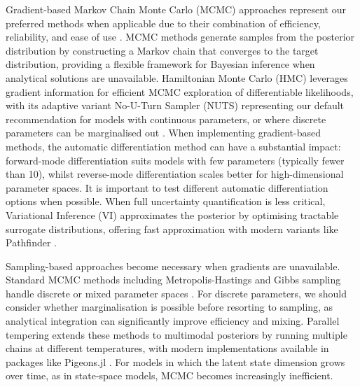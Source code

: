 \documentclass{article}
\begin{document}
Gradient-based Markov Chain Monte Carlo (MCMC) approaches represent our preferred methods when applicable due to their combination of efficiency, reliability, and ease of use \citep{gilks1995markov, lekone2006statistical}.
MCMC methods generate samples from the posterior distribution by constructing a Markov chain that converges to the target distribution, providing a flexible framework for Bayesian inference when analytical solutions are unavailable.
Hamiltonian Monte Carlo (HMC) leverages gradient information for efficient MCMC exploration of differentiable likelihoods, with its adaptive variant No-U-Turn Sampler (NUTS) representing our default recommendation for models with continuous parameters, or where discrete parameters can be marginalised out \citep{duane1987hybrid, hoffman2014no, andrade2020evaluation}.
When implementing gradient-based methods, the automatic differentiation method can have a substantial impact: forward-mode differentiation suits models with few parameters (typically fewer than 10), whilst reverse-mode differentiation scales better for high-dimensional parameter spaces.
It is important to test different automatic differentiation options when possible.
When full uncertainty quantification is less critical, Variational Inference (VI) approximates the posterior by optimising tractable surrogate distributions, offering fast approximation with modern variants like Pathfinder \citep{blei2017variational, chatzilena2019contemporary}.

Sampling-based approaches become necessary when gradients are unavailable.
Standard MCMC methods including Metropolis-Hastings and Gibbs sampling handle discrete or mixed parameter spaces \citep{hastings1970monte, geman1984stochastic, gilks1995markov}.
For discrete parameters, we should consider whether marginalisation is possible before resorting to sampling, as analytical integration can significantly improve efficiency and mixing.
Parallel tempering extends these methods to multimodal posteriors by running multiple chains at different temperatures, with modern implementations available in packages like Pigeons.jl \citep{surjanovic2023pigeons}.
For models in which the latent state dimension grows over time, as in state-space models, MCMC becomes increasingly inefficient.
\end{document}
